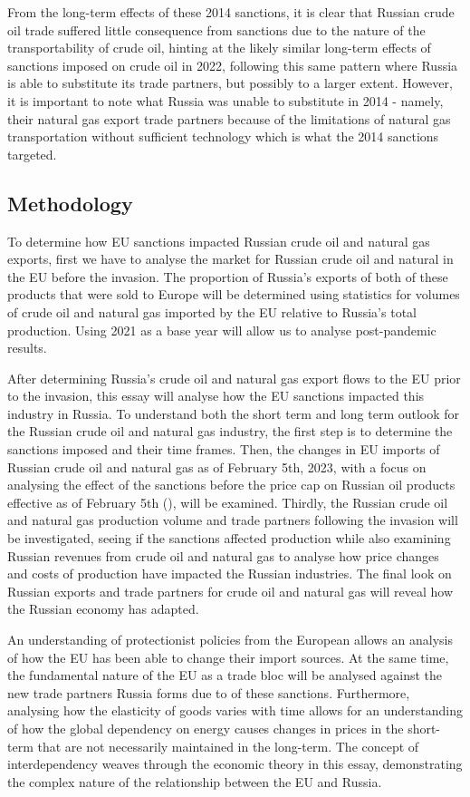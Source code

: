 \documentclass[12pt]{article}
\begin{document}
From the long-term effects of these 2014 sanctions, it is clear that Russian crude oil trade suffered little consequence from sanctions due to the nature of the transportability of crude oil, hinting at the likely similar long-term effects of sanctions imposed on crude oil in 2022, following this same pattern where Russia is able to substitute its trade partners, but possibly to a larger extent. However, it is important to note what Russia was unable to substitute in 2014 - namely, their natural gas export trade partners because of the limitations of natural gas transportation without sufficient technology which is what the 2014 sanctions targeted. 

 \subsection{Methodology}
 To determine how EU sanctions impacted Russian crude oil and natural gas exports, first we have to analyse the market for Russian crude oil and natural in the EU before the invasion. The proportion of Russia's exports of both of these products that were sold to Europe will be determined using statistics for volumes of crude oil and natural gas imported by the EU relative to Russia's total production. Using 2021 as a base year will allow us to analyse post-pandemic results. 

After determining Russia's crude oil and natural gas export flows to the EU prior to the invasion, this essay will analyse how the EU sanctions impacted this industry in Russia. To understand both the short term and long term outlook for the Russian crude oil and natural gas industry, the first step is to determine the sanctions imposed and their time frames. Then, the changes in EU imports of Russian crude oil and natural gas as of February 5th, 2023, with a focus on analysing the effect of the sanctions before the price cap on Russian oil products effective as of February 5th (\citeauthor{meredith_2023}), will be examined. Thirdly, the Russian crude oil and natural gas production volume and trade partners following the invasion will be investigated, seeing if the sanctions affected production while also examining Russian revenues from crude oil and natural gas to analyse how price changes and costs of production have impacted the Russian industries. The final look on Russian exports and trade partners for crude oil and natural gas will reveal how the Russian economy has adapted. 

An understanding of protectionist policies from the European allows an analysis of how the EU has been able to change their import sources. At the same time, the fundamental nature of the EU as a trade bloc will be analysed against the new trade partners Russia forms due to of these sanctions. Furthermore, analysing how the elasticity of goods varies with time allows for an understanding of how the global dependency on energy causes changes in prices in the short-term that are not necessarily maintained in the long-term. The concept of interdependency weaves through the economic theory in this essay, demonstrating the complex nature of the relationship between the EU and Russia. 
\end{document}
